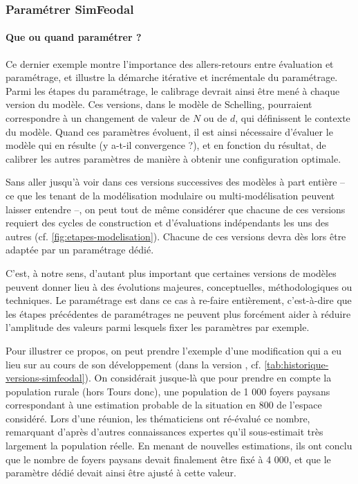 \subsubsection{Paramétrer SimFeodal \label{subsubsec:parametrage-simfeodal}}

\paragraph{Que ou quand paramétrer ?} \label{sssec:parametrer-un-des-modeles}

Ce dernier exemple montre l'importance des allers-retours entre évaluation et paramétrage, et illustre la démarche itérative et incrémentale du paramétrage.
Parmi les étapes du paramétrage, le calibrage devrait ainsi être mené à chaque \og version\fg{} du modèle.
Ces versions, dans le modèle de Schelling, pourraient correspondre à un changement de valeur de $N$ ou de $d$, qui définissent le contexte du modèle.
Quand ces paramètres évoluent, il est ainsi nécessaire d'évaluer le modèle qui en résulte (y a-t-il convergence ?), et en fonction du résultat, de calibrer les autres paramètres de manière à obtenir une configuration optimale.

Sans aller jusqu'à voir dans ces versions successives des modèles à part entière -- ce que les tenant de la modélisation modulaire \autocite{grimm_pattern-oriented_2005,grimm_pattern-oriented_2012} ou multi-modélisation \autocite{pumain_chapter_2017} peuvent laisser entendre --, on peut tout de même considérer que chacune de ces versions requiert des cycles de construction et d'évaluations indépendants les uns des autres (cf. \cref{fig:etapes-modelisation}).
Chacune de ces versions devra dès lors être adaptée par un paramétrage dédié.

C'est, à notre sens, d'autant plus important que certaines versions de modèles peuvent donner lieu à des évolutions majeures, conceptuelles, méthodologiques ou techniques.
Le paramétrage est dans ce cas à \og re-faire\fg{} entièrement, c'est-à-dire que les étapes précédentes de paramétrages ne peuvent plus forcément aider à réduire l'amplitude des valeurs parmi lesquels fixer les paramètres par exemple.

Pour illustrer ce propos, on peut prendre l'exemple d'une modification qui a eu lieu sur \simfeodal{} au cours de son développement (dans la version \fg{}, cf. \cref{tab:historique-versions-simfeodal}).
On considérait jusque-là que pour prendre en compte la population rurale (hors Tours donc), une population de 1 000 foyers paysans correspondant à une estimation probable de la situation en 800 de l'espace considéré.
Lors d'une réunion, les thématiciens ont ré-évalué ce nombre, remarquant d'après d'autres connaissances expertes qu'il sous-estimait très largement la population réelle.
En menant de nouvelles estimations, ils ont conclu que le nombre de foyers paysans devait finalement être fixé à 4 000, et que le paramètre dédié devait ainsi être ajusté à cette valeur.

